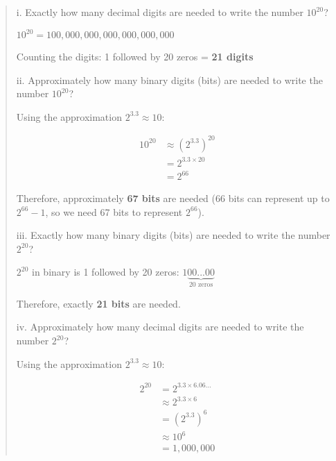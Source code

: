 \documentclass[12pt]{article}
\begin{document}
\begin{quote}
i. Exactly how many decimal digits are needed to write the number $10^{20}$?

\vspace{0.3cm}

$10^{20} = 100,000,000,000,000,000,000$

Counting the digits: 1 followed by 20 zeros = \textbf{21 digits}

\vspace{0.5cm}

ii. Approximately how many binary digits (bits) are needed to write the number $10^{20}$?

\vspace{0.3cm}

Using the approximation $2^{3.3} \approx 10$:

\begin{align*}
10^{20} &\approx (2^{3.3})^{20}\\
&= 2^{3.3 \times 20}\\
&= 2^{66}
\end{align*}

Therefore, approximately \textbf{67 bits} are needed (66 bits can represent up to $2^{66} - 1$, so we need 67 bits to represent $2^{66}$).

\vspace{0.5cm}

iii. Exactly how many binary digits (bits) are needed to write the number $2^{20}$?

\vspace{0.3cm}

$2^{20}$ in binary is 1 followed by 20 zeros: $1\underbrace{00...00}_{20 \text{ zeros}}$

Therefore, exactly \textbf{21 bits} are needed.

\vspace{0.5cm}

iv. Approximately how many decimal digits are needed to write the number $2^{20}$?

\vspace{0.3cm}

Using the approximation $2^{3.3} \approx 10$:

\begin{align*}
2^{20} &= 2^{3.3 \times 6.06...}\\
&\approx 2^{3.3 \times 6}\\
&= (2^{3.3})^6\\
&\approx 10^6\\
&= 1,000,000
\end{align*}


\end{quote}
\end{document}
